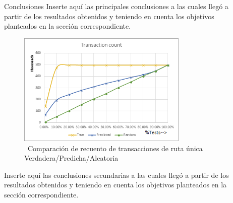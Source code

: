 \documentclass[final]{beamer}
\newlength{\sepwid}
\newlength{\onecolwid}
\newlength{\twocolwid}
\begin{document}
\begin{frame}[t]
\begin{columns}[t]
\begin{column}{\onecolwid}
\end{column} %

\begin{column}{\sepwid}\end{column} %

\begin{column}{\onecolwid}





\begin{block}{Conclusiones}
Inserte aquí las principales conclusiones a las cuales llegó a partir de los resultados obtenidos y teniendo en cuenta los objetivos planteados en la sección correspondiente.

\vspace{0.5cm}
\begin{figure}
    \includegraphics[width=0.8\textwidth]{Imagen3m.png}
    \caption{\ Comparación de recuento de transacciones de ruta única Verdadera/Predicha/Aleatoria}
\end{figure}

Inserte aquí las conclusiones secundarias a las cuales llegó a partir de los resultados obtenidos y teniendo en cuenta los objetivos planteados en la sección correspondiente.
\end{block}




\end{column}
\end{columns}
\end{frame}
\end{document}
